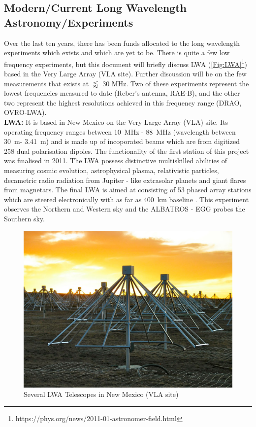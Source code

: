\documentclass[12pt,a4paper]{report}
\begin{document}
	\subsection{Modern/Current Long Wavelength Astronomy/Experiments}
		Over the last ten years, there has been funds allocated to the long wavelength experiments which exists and which are yet to be. There is quite a few low frequency experiments, but this document will briefly discuss LWA (\autoref{Fig:LWA}\footnote{https://phys.org/news/2011-01-astronomer-field.html}) based in the Very Large Array (VLA site). Further discussion will be on the few measurements that exists at $\lessapprox$ 30 MHz. Two of these experiments represent the lowest frequencies measured to date (Reber's antenna, RAE-B), and the other two represent the highest resolutions achieved in this frequency range (DRAO, OVRO-LWA).\\
		
		{\bf LWA:} It is based in New Mexico on the Very Large Array (VLA) site. Its operating frequency ranges between \SI{10}{MHz} - \SI{88}{MHz} (wavelength between \SI{30}{m}- \SI{3.41}{m}) and is made up of incoporated beams which are from digitized 258 dual polarisation dipoles. The functionality of the first station of this project was finalised in 2011. The LWA possess distinctive multiskilled abilities of measuring cosmic evolution, astrophysical plasma, relativistic particles, decametric radio radiation from Jupiter - like extrasolar planets and giant flares from magnetars. The final LWA is aimed at consisting of 53 phased array stations which are steered electronically with as far as \SI{400}{km} baseline \cite{2012JAI.....150004T,2010iska.meetE..24H}. This experiment observes the Northern and Western sky and the ALBATROS - EGG probes the Southern sky.\\
		
		
		\begin{figure}[h!]
			\begin{center}
				\includegraphics[width=0.5\linewidth]{Figures/LWA.jpg}
				\caption{Several LWA Telescopes in New Mexico (VLA site)}
				\label{Fig:LWA}
			\end{center}
		\end{figure}
		
\end{document}
